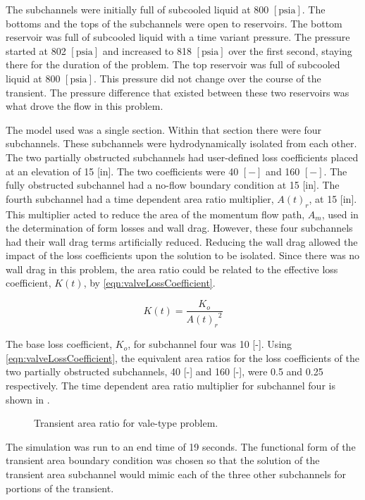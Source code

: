 The subchannels were initially full of subcooled liquid at 800 $[ \text{psia}] $.
The bottoms and the tops of the subchannels were open to reservoirs.
The bottom reservoir was full of subcooled liquid with a time variant pressure.
The pressure started at 802 $[ \text{psia} ] $ and increased to 818 $[ \text{psia}]$ over the first second, staying there for the duration of the problem.
The top reservoir was full of subcooled liquid at 800 $[\text{psia} ] $.
This pressure did not change over the course of the transient.
The pressure difference that existed between these two reservoirs was what drove the flow in this problem.

The model used was a single section.
Within that section there were four subchannels.
These subchannels were hydrodynamically isolated from each other.
The two partially obstructed subchannels had user-defined loss coefficients placed at an elevation of 15 [in].
The two coefficients were 40 $[-]$ and 160 $[-]$.
The fully obstructed subchannel had a no-flow boundary condition at 15 [in].
The fourth subchannel had a time dependent area ratio multiplier, $A(t)_r$, at 15 [in].
This multiplier acted to reduce the area of the momentum flow path, $A_m$, used in the determination of form losses and wall drag.
However, these four subchannels had their wall drag terms artificially reduced.
Reducing the wall drag allowed the impact of the loss coefficients upon the solution to be isolated.
Since there was no wall drag in this problem, the area ratio could be related to the effective loss coefficient, $K(t)$, by \eqref{eqn:valveLossCoefficient}.

\begin{equation}
\label{eqn:valveLossCoefficient}
K(t) = \frac{K_{o}}{{A(t)_r}^2}
\end{equation}

The base loss coefficient, $K_o$, for subchannel four was 10 [-].
Using \eqref{eqn:valveLossCoefficient}, the equivalent area ratios for the loss coefficients of the two partially obstructed subchannels, 40 [-] and 160 [-], were 0.5 and 0.25 respectively.
The time dependent area ratio multiplier for subchannel four is shown in .

\begin{figure}[h!tb]
\centering

\caption{Transient area ratio for vale-type problem.}
\label{fig:valveTransientArea}
\end{figure}

The simulation was run to an end time of 19 seconds.
The functional form of the transient area boundary condition was chosen so that the solution of the transient area subchannel would mimic each of the three other subchannels for portions of the transient.

